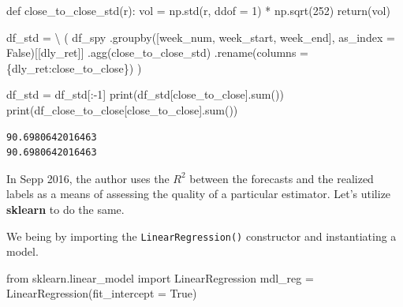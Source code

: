 \documentclass[
  letterpaper,
  DIV=11,
  numbers=noendperiod]{scrreprt}
\newenvironment{Shaded}{\begin{snugshade}}{\end{snugshade}}
\newcommand{\BuiltInTok}[1]{\textcolor[rgb]{0.00,0.23,0.31}{#1}}
\newcommand{\ControlFlowTok}[1]{\textcolor[rgb]{0.00,0.23,0.31}{#1}}
\newcommand{\DecValTok}[1]{\textcolor[rgb]{0.68,0.00,0.00}{#1}}
\newcommand{\ImportTok}[1]{\textcolor[rgb]{0.00,0.46,0.62}{#1}}
\newcommand{\KeywordTok}[1]{\textcolor[rgb]{0.00,0.23,0.31}{#1}}
\newcommand{\NormalTok}[1]{\textcolor[rgb]{0.00,0.23,0.31}{#1}}
\newcommand{\OperatorTok}[1]{\textcolor[rgb]{0.37,0.37,0.37}{#1}}
\newcommand{\StringTok}[1]{\textcolor[rgb]{0.13,0.47,0.30}{#1}}
\newcommand{\VariableTok}[1]{\textcolor[rgb]{0.07,0.07,0.07}{#1}}
\begin{document}
\begin{Shaded}
\begin{Highlighting}[]
\KeywordTok{def}\NormalTok{ close\_to\_close\_std(r):}
\NormalTok{    vol }\OperatorTok{=}\NormalTok{ np.std(r, ddof }\OperatorTok{=} \DecValTok{1}\NormalTok{) }\OperatorTok{*}\NormalTok{ np.sqrt(}\DecValTok{252}\NormalTok{)}
    \ControlFlowTok{return}\NormalTok{(vol)}

\NormalTok{df\_std }\OperatorTok{=} \OperatorTok{\textbackslash{}}
\NormalTok{    (}
\NormalTok{    df\_spy}
\NormalTok{        .groupby([}\StringTok{\textquotesingle{}week\_num\textquotesingle{}}\NormalTok{, }\StringTok{\textquotesingle{}week\_start\textquotesingle{}}\NormalTok{, }\StringTok{\textquotesingle{}week\_end\textquotesingle{}}\NormalTok{], as\_index }\OperatorTok{=} \VariableTok{False}\NormalTok{)[[}\StringTok{\textquotesingle{}dly\_ret\textquotesingle{}}\NormalTok{]]}
\NormalTok{        .agg(close\_to\_close\_std)}
\NormalTok{        .rename(columns }\OperatorTok{=}\NormalTok{ \{}\StringTok{\textquotesingle{}dly\_ret\textquotesingle{}}\NormalTok{:}\StringTok{\textquotesingle{}close\_to\_close\textquotesingle{}}\NormalTok{\})}
\NormalTok{    )}
    
\NormalTok{df\_std }\OperatorTok{=}\NormalTok{ df\_std[:}\OperatorTok{{-}}\DecValTok{1}\NormalTok{]}
\BuiltInTok{print}\NormalTok{(df\_std[}\StringTok{\textquotesingle{}close\_to\_close\textquotesingle{}}\NormalTok{].}\BuiltInTok{sum}\NormalTok{())}
\BuiltInTok{print}\NormalTok{(df\_close\_to\_close[}\StringTok{\textquotesingle{}close\_to\_close\textquotesingle{}}\NormalTok{].}\BuiltInTok{sum}\NormalTok{())}
\end{Highlighting}
\end{Shaded}

\begin{verbatim}
90.6980642016463
90.6980642016463
\end{verbatim}

In Sepp 2016, the author uses the \(R^2\) between the forecasts and the
realized labels as a means of assessing the quality of a particular
estimator. Let's utilize \textbf{sklearn} to do the same.

We being by importing the \texttt{LinearRegression()} constructor and
instantiating a model.

\begin{Shaded}
\begin{Highlighting}[]
\ImportTok{from}\NormalTok{ sklearn.linear\_model }\ImportTok{import}\NormalTok{ LinearRegression}
\NormalTok{mdl\_reg }\OperatorTok{=}\NormalTok{ LinearRegression(fit\_intercept }\OperatorTok{=} \VariableTok{True}\NormalTok{)}
\end{Highlighting}
\end{Shaded}
\end{document}

